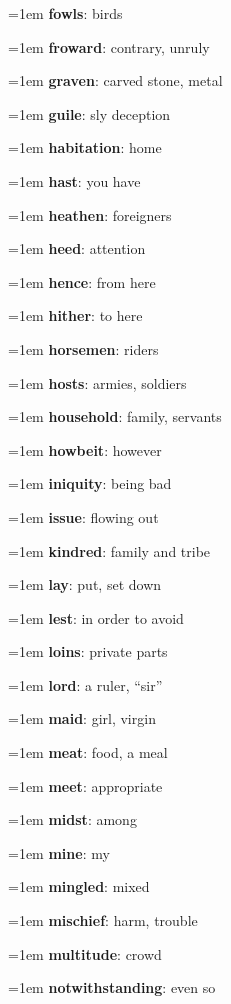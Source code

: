 {\begin{multicols}{3}
{\hangindent=1em \textbf{fowls}: birds\par
\hangindent=1em \textbf{froward}: contrary, unruly\par
\hangindent=1em \textbf{graven}: carved stone, metal\par
\hangindent=1em \textbf{guile}: sly deception\par
\hangindent=1em \textbf{habitation}: home\par
\hangindent=1em \textbf{hast}: you have\par
\hangindent=1em \textbf{heathen}: foreigners\par
\hangindent=1em \textbf{heed}: attention\par
\hangindent=1em \textbf{hence}: from here\par
\hangindent=1em \textbf{hither}: to here\par
\hangindent=1em \textbf{horsemen}: riders\par
\hangindent=1em \textbf{hosts}: armies, soldiers\par
\hangindent=1em \textbf{household}: family, servants\par
\hangindent=1em \textbf{howbeit}: however\par
\hangindent=1em \textbf{iniquity}: being bad\par
\hangindent=1em \textbf{issue}: flowing out\par
\hangindent=1em \textbf{kindred}: family and tribe\par
\hangindent=1em \textbf{lay}: put, set down\par
\hangindent=1em \textbf{lest}: in order to avoid\par
\hangindent=1em \textbf{loins}: private parts\par
\hangindent=1em \textbf{lord}: a ruler, “sir”\par
\hangindent=1em \textbf{maid}: girl, virgin\par
\hangindent=1em \textbf{meat}: food, a meal\par
\hangindent=1em \textbf{meet}: appropriate\par
\hangindent=1em \textbf{midst}: among\par
\hangindent=1em \textbf{mine}: my\par
\hangindent=1em \textbf{mingled}: mixed\par
\hangindent=1em \textbf{mischief}: harm, trouble\par
\hangindent=1em \textbf{multitude}: crowd\par
\hangindent=1em \textbf{notwithstanding}: even so\par
}
\end{multicols}}
